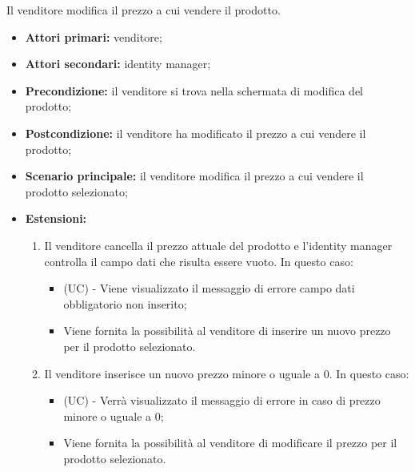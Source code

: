 Il venditore modifica il prezzo a cui vendere il prodotto.
\begin{itemize}
    \item \textbf{Attori primari:} venditore;
    \item \textbf{Attori secondari:} identity manager;
    \item \textbf{Precondizione:} il venditore si trova nella schermata di modifica del prodotto;
    \item \textbf{Postcondizione:} il venditore ha modificato il prezzo a cui vendere il prodotto;
    \item \textbf{Scenario principale:} il venditore modifica il prezzo a cui vendere il prodotto selezionato;
    \item \textbf{Estensioni:}
    \begin{enumerate}[label=\lett]
    	\item Il venditore cancella il prezzo attuale del prodotto e l'identity manager controlla il campo dati che risulta essere vuoto. In questo caso:
    	\begin{itemize}
    		\item (UC) - Viene visualizzato il messaggio di errore campo dati obbligatorio non inserito;
    		\item Viene fornita la possibilità al venditore di inserire un nuovo prezzo per il prodotto selezionato.
    	\end{itemize}
    	\item Il venditore inserisce un nuovo prezzo minore o uguale a 0. In questo caso:
    	\begin{itemize}
    		\item (UC) - Verrà visualizzato il messaggio di errore in caso di prezzo minore o uguale a 0;
    		\item Viene fornita la possibilità al venditore di modificare il prezzo per il prodotto selezionato.
    	\end{itemize}
    \end{enumerate}
\end{itemize}

